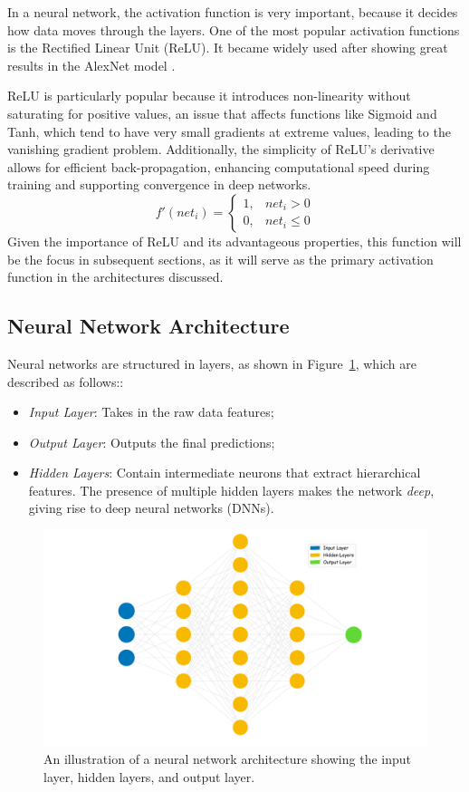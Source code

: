 In a neural network, the activation function is very important, because it decides how data moves through the layers. One of the most popular activation functions is the Rectified Linear Unit (ReLU). It became widely used after showing great results in the AlexNet model \cite{NIPS2012_c399862d}.

ReLU is particularly popular because it introduces non-linearity without saturating for positive values, an issue that affects functions like Sigmoid and Tanh, which tend to have very small gradients at extreme values, leading to the vanishing gradient problem. Additionally, the simplicity of ReLU’s derivative allows for efficient back-propagation, enhancing computational speed during training and supporting convergence in deep networks.
\begin{equation}
    f'(\textit{net}_i) =
    \begin{cases}
    1, & \textit{net}_i > 0 \\
    0, & \textit{net}_i \leq 0
    \end{cases}
\end{equation}
Given the importance of ReLU and its advantageous properties, this function will be the focus in subsequent sections, as it will serve as the primary activation function in the architectures discussed.

\subsection{Neural Network Architecture}
Neural networks are structured in layers, as shown in Figure~\ref{fig:nn-architecture}, which are described as follows::
\begin{itemize}
    \item \textit{Input Layer}: Takes in the raw data features;
    \item \textit{Output Layer}: Outputs the final predictions;
    \item \textit{Hidden Layers}: Contain intermediate neurons that extract hierarchical features. The presence of multiple hidden layers makes the network \textit{deep}, giving rise to deep neural networks (DNNs).
\end{itemize}
\begin{figure}[H]
    \centering
    \includegraphics[width=0.75\linewidth]{LateX//figs/nn_intro_def.pdf}
    \caption{An illustration of a neural network architecture showing the input layer, hidden layers, and output layer.}
    \label{fig:nn-architecture}
\end{figure}

